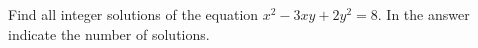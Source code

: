 Find all integer solutions of the equation $x^{2}-3xy+2y^{2}=8$. In the answer indicate the number of solutions.
